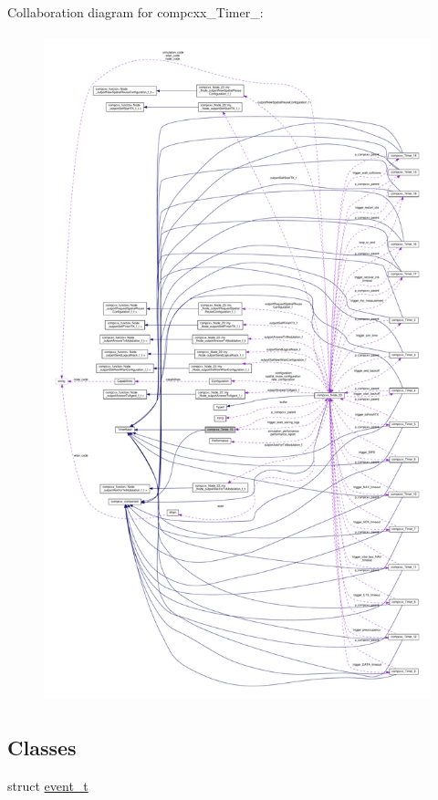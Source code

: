 Collaboration diagram for compcxx\+\_\+\+Timer\+\_\+:\nopagebreak
\begin{figure}[H]
\begin{center}
\leavevmode
\includegraphics[height=550pt]{classcompcxx__Timer__15__coll__graph}
\end{center}
\end{figure}
\subsection*{Classes}
\begin{DoxyCompactItemize}
\item 
struct \hyperlink{structcompcxx__Timer__15_1_1event__t}{event\+\_\+t}
\end{DoxyCompactItemize}
